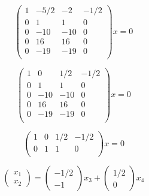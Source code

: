 \documentclass{article}
\begin{document}
\[
\left(
\begin{matrix}
1& -5/2& -2& -1/2\\
0& 1& 1& 0\\
0& -10& -10& 0\\
0& 16& 16& 0\\
0& -19& -19& 0\\
\end{matrix}
\right) x = 0
\]

\[
\left(
\begin{matrix}
1& 0& 1/2& -1/2\\
0& 1& 1& 0\\
0& -10& -10& 0\\
0& 16& 16& 0\\
0& -19& -19& 0\\
\end{matrix}
\right) x = 0
\]

\[
\left(
\begin{matrix}
1& 0& 1/2& -1/2\\
0& 1& 1& 0\\
\end{matrix}
\right) x = 0
\]

\[
\left(
\begin{matrix}
x_1\\
x_2
\end{matrix}
\right) =
\left(
\begin{matrix}
-1/2\\
-1
\end{matrix}
\right) x_3 +
\left(
\begin{matrix}
1/2\\
0
\end{matrix}
\right) x_4
\]
\end{document}

